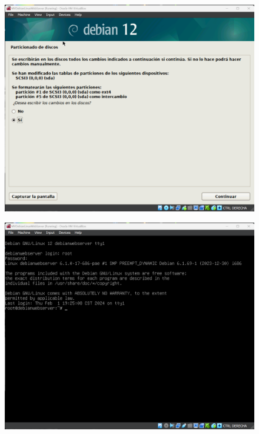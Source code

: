 \documentclass[12pt,a4paper]{article}
\begin{document}
\begin{figure}[H]
    \centering
    \includegraphics[width=1\linewidth]{M3_Virtualización_y_Contenedores/Tarea_2_Máquina_Virtual_Local/reporte/figuras/3-2_Máquina_Virtual_de_Debian.png}
    \label{fig:Instalación_Debian_2}
\end{figure}


\begin{figure}[H]
    \centering
    \includegraphics[width=1\linewidth]{M3_Virtualización_y_Contenedores/Tarea_2_Máquina_Virtual_Local/reporte/figuras/3-3_Máquina_Virtual_de_Debian.png}
    \label{fig:Instalación_Debian_3}
\end{figure}
\end{document}
